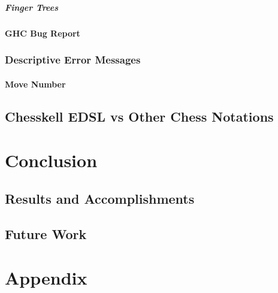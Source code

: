 \documentclass[12pt, a4paper, bibliography=totocnumbered]{scrreprt}
\begin{document}
\subsubsection{Finger Trees}

\subsection{GHC Bug Report}

\section{Descriptive Error Messages}

\subsection{Move Number}

\chapter{Chesskell EDSL vs Other Chess Notations}


\part{Conclusion}

\chapter{Results and Accomplishments}

\chapter{Future Work}


\part{Appendix}






\end{document}
